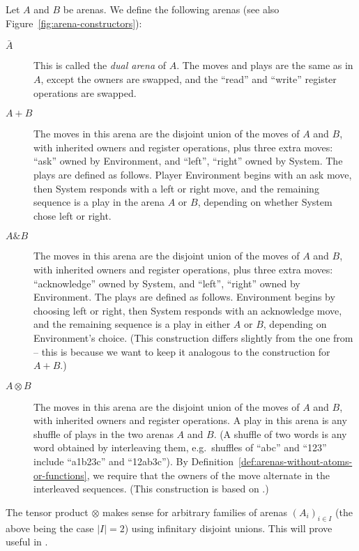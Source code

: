 \documentclass[a4paper,UKenglish,cleveref, autoref, numberwithinsect, thm-restate]{lipics-v2021}
\begin{document}
\begin{definition}\label{def:composition-of-arenas}
    Let  $A$ and $B$ be arenas. We define the following arenas (see also Figure~\ref{fig:arena-constructors}):
        \begin{description}
            \item[$\bar A$] This is called the \emph{dual arena} of $A$. The moves and plays are the same as in $A$, except the owners are swapped, and the ``read'' and ``write'' register operations are swapped.
            \item[$A+B$] The moves in this arena are the disjoint union of the moves of $A$ and $B$, with inherited owners and register operations, plus three extra moves: ``ask'' owned by Environment, and ``left'', ``right'' owned by System. 
            The plays are defined as follows. Player Environment begins with  an ask move, then System responds with a left or right move, and the remaining sequence is a play in the arena $A$ or $B$, depending on whether System chose left or right. 
            \item[$A \& B$] The moves in this arena are the disjoint union of the moves of $A$ and $B$, with inherited owners and register operations, plus three extra moves: ``acknowledge'' owned by System, and ``left'', ``right'' owned by Environment. 
            The plays are defined as follows. Environment begins by choosing left or right, then System responds with an acknowledge move, and the remaining sequence is a play in either $A$ or $B$, depending on Environment's choice.
            (This construction differs slightly from the one from \cite[Exercise~1.10]{abramsky2013semantics} -- this is because we want to keep it analogous to the construction for $A + B$.)
            \item[$A \otimes B$] The moves in this arena are the disjoint union of the moves of $A$ and $B$, with inherited owners and register operations. A play in this arena is any shuffle of plays in the two arenas $A$ and $B$. (A shuffle of two words is any word obtained by interleaving them, e.g.~shuffles of ``abc'' and ``123'' include ``a1b23c'' and ``12ab3c'').
            By Definition~\ref{def:arenas-without-atoms-or-functions}, we require that the owners of the move alternate in the 
            interleaved sequences. (This construction is based on \cite[p.7]{abramsky2013semantics}.) 
        \end{description} 
\end{definition}
The tensor product $\otimes$ makes sense for arbitrary families of arenas $(A_i)_{i\in I}$ (the above being the case $|I|=2$) using infinitary disjoint unions. This will prove useful in .
\end{document}
